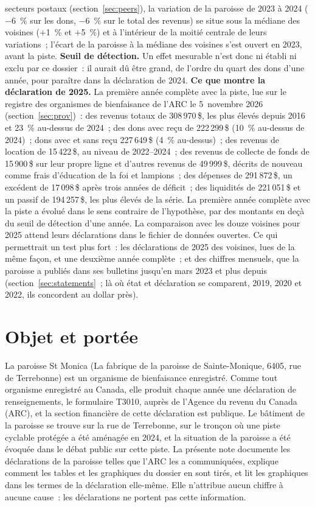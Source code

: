 \documentclass[11pt,letterpaper]{article}
\newcommand{\D}[1]{#1\,\$}
\begin{document}
secteurs postaux (section~\ref{sec:peers}), la variation de la paroisse de 2023 à 2024 ($-$6~\% sur les dons, $-$6~\% sur le total des revenus) se situe sous la médiane des voisines ($+$1~\% et $+$5~\%) et à l'intérieur de la moitié centrale de leurs variations~; l'écart de la paroisse à la médiane des voisines s'est ouvert en 2023, avant la piste. \textbf{Seuil de détection.}  Un effet mesurable n'est donc ni établi ni exclu par ce dossier~: il aurait dû être grand, de l'ordre du quart des dons d'une année, pour paraître dans la déclaration de 2024. \textbf{Ce que montre la déclaration de 2025.} La première année complète avec la piste, lue sur le registre des organismes de bienfaisance de l'ARC le 5~novembre 2026 (section~\ref{sec:prov})~: des revenus totaux de \D{308\,970}, les plus élevés depuis 2016 et 23~\% au-dessus de 2024~; des dons avec reçu de \D{222\,299} (10~\% au-dessus de 2024)~; dons avec et sans reçu \D{227\,649} (4~\% au-dessus)~; des revenus de location de \D{15\,422}, au niveau de 2022--2024~; des revenus de collecte de fonds de \D{15\,900} sur leur propre ligne et d'autres revenus de \D{49\,999}, décrits de nouveau comme frais d'éducation de la foi et lampions~; des dépenses de \D{291\,872}, un excédent de \D{17\,098} après trois années de déficit~; des liquidités de \D{221\,051} et un passif de \D{194\,257}, les plus élevés de la série. La première année complète avec la piste a évolué dans le sens contraire de l'hypothèse, par des montants en deçà du seuil de détection d'une année. La comparaison avec les douze voisines pour 2025 attend leurs déclarations dans le fichier de données ouvertes. Ce qui permettrait un test plus fort~: les déclarations de 2025 des voisines, lues de la même façon, et une deuxième année complète~; et des chiffres mensuels, que la paroisse a publiés dans ses bulletins jusqu'en mars 2023 et plus depuis (section~\ref{sec:statements}~; là où état et déclaration se comparent, 2019, 2020 et 2022, ils concordent au dollar près).

\section{Objet et portée}

La paroisse St Monica (La fabrique de la paroisse de Sainte-Monique, 6405, rue de Terrebonne) est un organisme de bienfaisance enregistré. Comme tout organisme enregistré au Canada, elle produit chaque année une déclaration de renseignements, le formulaire T3010, auprès de l'Agence du revenu du Canada (ARC), et la section financière de cette déclaration est publique. Le bâtiment de la paroisse se trouve sur la rue de Terrebonne, sur le tronçon où une piste cyclable protégée a été aménagée en 2024, et la situation de la paroisse a été évoquée dans le débat public sur cette piste. La présente note documente les déclarations de la paroisse telles que l'ARC les a communiquées, explique comment les tables et les graphiques du dossier en sont tirés, et lit les graphiques dans les termes de la déclaration elle-même. Elle n'attribue aucun chiffre à aucune cause~: les déclarations ne portent pas cette information.
\end{document}
